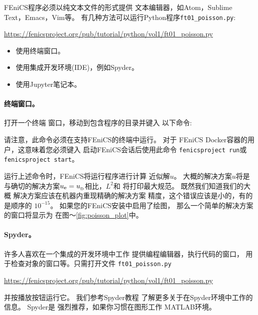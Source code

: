FEniCS程序必须以纯文本文件的形式提供
文本编辑器，如Atom，Sublime Text，Emacs，Vim等。
有几种方法可以运行Python程序{\nolinkurl{ft01_poisson.py}}:
\begin{center}
  \url{https://fenicsproject.org/pub/tutorial/python/vol1/ft01_poisson.py}
\end{center}

\begin{itemize}
 \item 使用终端窗口。

 \item 使用集成开发环境(IDE)，例如Spyder。

 \item 使用Jupyter笔记本。
\end{itemize}

\noindent
\paragraph{终端窗口。}

打开一个终端
窗口，移动到包含程序的目录并键入
以下命令:


请注意，此命令必须在支持FEniCS的终端中运行。 对于
FEniCS Docker容器的用户，这意味着您必须键入
启动FEniCS会话后使用此命令
\texttt{fenicsproject run}或\texttt{fenicsproject start}。

运行上述命令时，FEniCS将运行程序进行计算
近似解$u$。 大概的解决方案$u$将是
与确切的解决方案$\uex = \ub$相比，$L^2$和
将打印最大规范。 既然我们知道我们的大概
解决方案应该在机器内重现精确的解决方案
精度，这个错误应该是小的，有的是顺序的
$10^{-15}$。 如果您的FEniCS安装中启用了绘图，
那么一个简单的解决方案的窗口将显示为
在图〜\ref{fig:poisson_plot}中。

\paragraph{Spyder。}

许多人喜欢在一个集成的开发环境中工作
提供编程编辑器，执行代码的窗口，
用于检查对象的窗口等。只需打开文件
{\nolinkurl{ft01_poisson.py}}
\begin{center}
  \url{https://fenicsproject.org/pub/tutorial/python/vol1/ft01_poisson.py}
\end{center}
并按播放按钮运行它。 我们参考Spyder教程
了解更多关于在Spyder环境中工作的信息。 Spyder是
强烈推荐，如果你习惯在图形工作
MATLAB环境。


